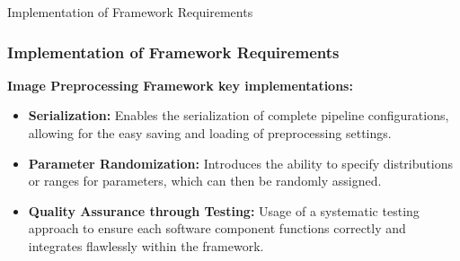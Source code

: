 \begin{frame}{Implementation of Framework Requirements}
    \frametitle{Implementation of Framework Requirements}
    \textbf{Image Preprocessing Framework key implementations:}
    \vspace{0.5em}
    \begin{itemize}
        \item \textbf{Serialization:} Enables the serialization of complete pipeline configurations, allowing for the easy saving and loading of preprocessing settings.
        \item \textbf{Parameter Randomization:} Introduces the ability to specify distributions or ranges for parameters, which can then be randomly assigned.
        \item \textbf{Quality Assurance through Testing:} Usage of a systematic testing approach to ensure each software component functions correctly and integrates flawlessly within the framework.
    \end{itemize}
\end{frame}


